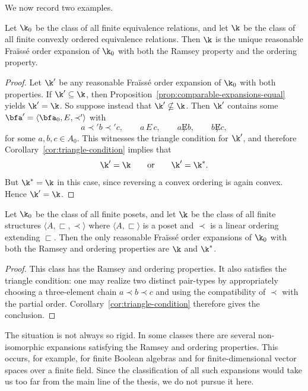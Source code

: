 We now record two examples.

\begin{example}
    Let $\k_0$ be the class of all finite equivalence relations, and let $\k$ be the class of all finite convexly ordered equivalence relations. Then $\k$ is the unique reasonable Fra\"iss\'e order expansion of $\k_0$ with both the Ramsey property and the ordering property.
\end{example}

\begin{proof}
    Let $\k'$ be any reasonable Fra\"iss\'e order expansion of $\k_0$ with
    both properties. If \(\k'\subseteq \k\),
    then Proposition~\ref{prop:comparable-expansions-equal} yields
    \(\k'=\k\).
    So suppose instead that $\k'\nsubseteq \k$. Then $\k'$ contains some
    \(\bfa'=\langle \bfa_0,E,\prec'\rangle\)
    with
    \[
        a\prec' b\prec' c,
        \qquad
        a\,E\,c,
        \qquad
        a\not E b,
        \qquad
        b\not E c,
    \]
    for some $a,b,c\in A_0$. This witnesses the triangle condition for $\k'$, and therefore Corollary~\ref{cor:triangle-condition} implies that
    \[
        \k'=\k
        \qquad\text{or}\qquad
        \k'=\k^*.
    \]
    But $\k^*=\k$ in this case, since reversing a convex ordering is again
    convex. Hence \(\k'=\k\).
\end{proof}

\begin{example}
    Let $\k_0$ be the class of all finite posets, and let $\k$ be the class of
    all finite structures \(\langle A,\sqsubset,\prec\rangle\)
    where $\langle A,\sqsubset\rangle$ is a poset and $\prec$ is a linear ordering extending $\sqsubset$. Then the only reasonable Fra\"iss\'e order expansions of $\k_0$ with both the Ramsey and ordering properties are $\k$ and $\k^*$.
\end{example}

\begin{proof}
    This class has the Ramsey and ordering properties. It also satisfies the
    triangle condition: one may realize two distinct pair-types by appropriately
    choosing a three-element chain \(a\prec b\prec c\)
    and using the compatibility of $\prec$ with the partial order. Corollary~\ref{cor:triangle-condition} therefore gives the conclusion.
\end{proof}

The situation is not always so rigid. In some classes there are several non-isomorphic expansions satisfying the Ramsey and ordering properties. This occurs, for example, for finite Boolean algebras and for finite-dimensional vector spaces over a finite field. Since the classification of all such expansions would take us too far from the main line of the thesis, we do not pursue it here.

